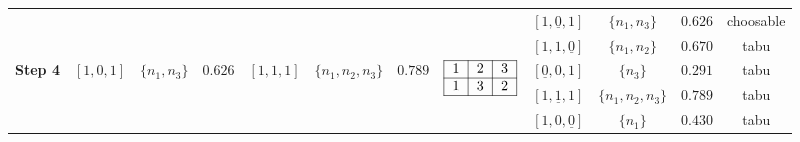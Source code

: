 \begin{table}[hbt]
{\begin{tabular}{|c|c|c|c|c|c|c|c|c|c|c|c|}
    \multicolumn{1}{|c|}{}
    &\multicolumn{1}{c|}{}
    &\multicolumn{1}{c|}{}
    &\multicolumn{1}{c|}{}
    &\multicolumn{1}{c|}{}
    &\multicolumn{1}{c|}{}
    &\multicolumn{1}{c|}{}
    &\multicolumn{1}{c|}{}
    &$[1,\underline{0},1]$ & $\{n_1,n_3\}$ & $0.626$ & choosable
    \\
    
    \multicolumn{1}{|c|}{}
    &\multicolumn{1}{c|}{}
    &\multicolumn{1}{c|}{}
    &\multicolumn{1}{c|}{}
    &\multicolumn{1}{c|}{}
    &\multicolumn{1}{c|}{}
    &\multicolumn{1}{c|}{}
    &\multicolumn{1}{c|}{}
    &$[1,1,\underline{0}]$ & $\{n_1,n_2\}$ & $0.670$ & tabu
    \\

    \hline
    \multicolumn{1}{|c|}{\multirow{3}{*}{\textbf{Step 4}}}
    &\multicolumn{1}{c|}{\multirow{3}{*}{$[1,0,1]$}}
    &\multicolumn{1}{c|}{\multirow{3}{*}{$\{n_1,n_3\}$}}
    &\multicolumn{1}{c|}{\multirow{3}{*}{$0.626$}}
    &\multicolumn{1}{c|}{\multirow{3}{*}{$[1,1,1]$}}
    &\multicolumn{1}{c|}{\multirow{3}{*}{$\{n_1,n_2,n_3\}$}}
    &\multicolumn{1}{c|}{\multirow{3}{*}{$0.789$}}
    &\multicolumn{1}{c|}{\multirow{3}{*}{$
                                                     \begin{tabular}{|c|c|c|}
                                                        \hline
                                                        1 & 2 & 3 \\
                                                        \hline
                                                        1 & 3 & 2 \\
                                                        \hline
                                                     \end{tabular}$}}
    &$[\underline{0},0,1]$ &$\{n_3\}$ & $0.291$ & tabu
    \\
    
    \multicolumn{1}{|c|}{}
    &\multicolumn{1}{c|}{}
    &\multicolumn{1}{c|}{}
    &\multicolumn{1}{c|}{}
    &\multicolumn{1}{c|}{}
    &\multicolumn{1}{c|}{}
    &\multicolumn{1}{c|}{}
    &\multicolumn{1}{c|}{}
    &$[1,\underline{1},1]$ & $\{n_1,n_2,n_3\}$ & $0.789$ & tabu
    \\
    
    \multicolumn{1}{|c|}{}
    &\multicolumn{1}{c|}{}
    &\multicolumn{1}{c|}{}
    &\multicolumn{1}{c|}{}
    &\multicolumn{1}{c|}{}
    &\multicolumn{1}{c|}{}
    &\multicolumn{1}{c|}{}
    &\multicolumn{1}{c|}{}
    &$[1,0,\underline{0}]$ & $\{n_1\}$ & $0.430$ & tabu
    \\
    

\end{tabular}}
\end{table}
